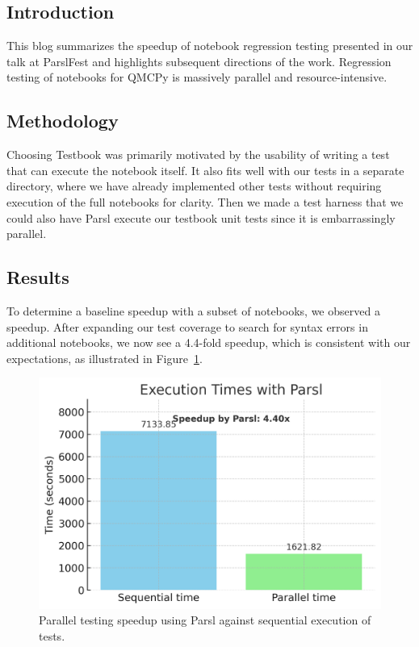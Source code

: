 \subsection{Introduction}

 This blog summarizes the speedup of notebook regression testing presented in our talk at ParslFest \cite{parslfest2025} 
 and highlights subsequent directions of the work. Regression testing of notebooks for QMCPy \cite{QMCPy2020a} is massively parallel and resource-intensive.

\subsection{Methodology}

 Choosing Testbook \cite{testbook2021} was primarily motivated by the usability of writing a test that can execute the notebook itself. It also fits well with our tests in a separate directory, where we have already implemented other tests without requiring execution of the full notebooks for clarity. Then we made a test harness that we could also have Parsl \cite{parsl2019} execute our testbook unit tests since it is embarrassingly parallel.

\subsection{Results}

To determine a baseline speedup with a subset of notebooks, we observed a speedup. 
After expanding our test coverage to search for syntax errors in additional notebooks, we now see a 4.4-fold speedup, which is consistent with our expectations, as illustrated in Figure~\ref{fig:parsl_speedup}. 

\begin{figure}[htbp]
    \centering
    \includegraphics[width=.7\textwidth]{booktests/parsl_speedup_chart_no_x_lines.png}
    \caption{Parallel testing speedup using Parsl against sequential execution of tests.}
    \label{fig:parsl_speedup}
\end{figure}

